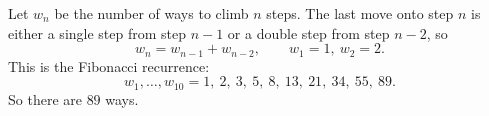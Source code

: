 Let $w_n$ be the number of ways to climb $n$ steps. The last move onto step $n$ is either a single step from step $n-1$ or a double step from step $n-2$, so
\[
w_n=w_{n-1}+w_{n-2},\qquad w_1=1,\ w_2=2 .
\]
This is the Fibonacci recurrence:
\[
w_1,\dots,w_{10}=1,\ 2,\ 3,\ 5,\ 8,\ 13,\ 21,\ 34,\ 55,\ 89 .
\]
So there are $\boxed{89}$ ways.
